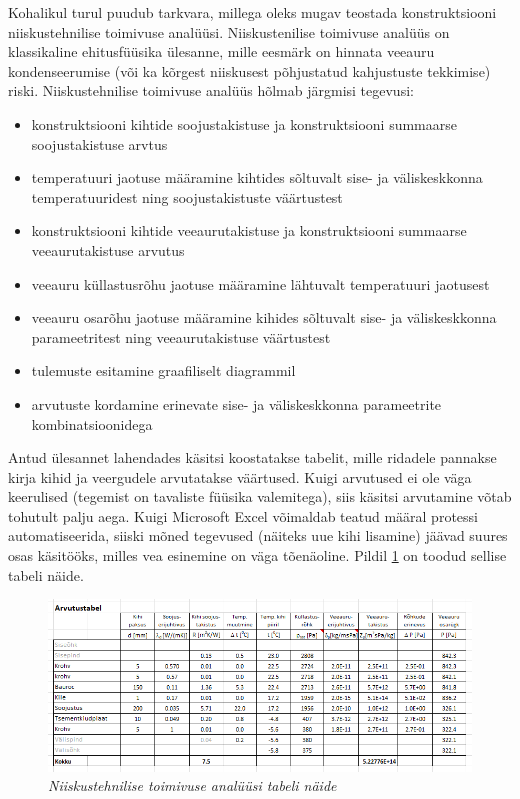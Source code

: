 Kohalikul turul puudub tarkvara, millega oleks mugav teostada konstruktsiooni
 niiskustehnilise toimivuse analüüsi. Niiskustenilise toimivuse analüüs on klassikaline ehitusfüüsika ülesanne, mille 
 eesmärk on hinnata veeauru kondenseerumise (või ka kõrgest niiskusest põhjustatud kahjustuste tekkimise) riski.
Niiskustehnilise toimivuse analüüs hõlmab järgmisi tegevusi:
\begin{itemize}
    \item konstruktsiooni kihtide soojustakistuse ja konstruktsiooni summaarse soojustakistuse arvtus
    \item temperatuuri jaotuse määramine kihtides sõltuvalt sise- ja väliskeskkonna temperatuuridest ning 
    soojustakistuste väärtustest
    \item konstruktsiooni kihtide veeaurutakistuse ja konstruktsiooni summaarse veeaurutakistuse arvutus
    \item veeauru küllastusrõhu jaotuse määramine lähtuvalt temperatuuri jaotusest
    \item veeauru osarõhu jaotuse määramine kihides sõltuvalt sise- ja väliskeskkonna parameetritest ning 
    veeaurutakistuse väärtustest
    \item tulemuste esitamine graafiliselt diagrammil
    \item arvutuste kordamine erinevate sise- ja väliskeskkonna parameetrite kombinatsioonidega
\end{itemize}

Antud ülesannet lahendades käsitsi koostatakse tabelit, mille ridadele pannakse kirja kihid ja veergudele arvutatakse 
väärtused. Kuigi arvutused ei ole väga keerulised (tegemist on tavaliste füüsika valemitega), siis käsitsi arvutamine 
võtab tohutult palju aega. Kuigi Microsoft Excel võimaldab teatud määral protessi automatiseerida, siiski mõned 
tegevused (näiteks uue kihi lisamine) jäävad suures osas käsitööks, milles vea esinemine on väga tõenäoline. Pildil 
\ref{fig:excel_table_sample} on toodud sellise tabeli näide.
\begin{figure}[ht]
    \centering
    \includegraphics[width=.8\textwidth]{figures/01_analogues/04_calc_table.png}
    \caption{\textit{Niiskustehnilise toimivuse analüüsi tabeli näide}}
    \label{fig:excel_table_sample}
\end{figure}

